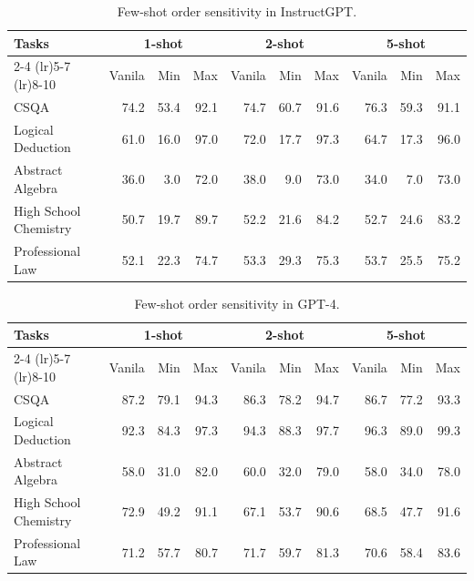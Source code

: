 \documentclass[11pt]{article}
\begin{document}
\begin{table}[t!]
\small
\centering
\begin{tabular}{lrrrrrrrrr}
\toprule 
\multirow{2}{*}{\bf Tasks} & \multicolumn{3}{c}{\bf 1-shot}&  \multicolumn{3}{c}{\bf 2-shot}&  \multicolumn{3}{c}{\bf 5-shot}\\
\cmidrule(lr){2-4}
\cmidrule(lr){5-7}
\cmidrule(lr){8-10}
&Vanila&Min&Max&Vanila&Min&Max&Vanila&Min&Max\\
\midrule
CSQA &74.2&53.4&92.1&74.7&60.7 & 91.6&76.3&59.3&91.1\\
Logical Deduction&61.0&16.0&97.0&72.0&17.7&97.3&64.7&17.3&96.0\\
Abstract Algebra &36.0&3.0&72.0&38.0&9.0&73.0&34.0&7.0&73.0\\
High School Chemistry &50.7&19.7&89.7&52.2&21.6&84.2&52.7&24.6&83.2\\
Professional Law &52.1&22.3&74.7&53.3&29.3&75.3&53.7&25.5&75.2\\
\bottomrule
\end{tabular}
\caption{Few-shot order sensitivity in InstructGPT.}
\label{tab:instruct-few}
\end{table}
\begin{table}[t!]
\small
\centering
\begin{tabular}{lrrrrrrrrr}
\toprule 
\multirow{2}{*}{\bf Tasks} & \multicolumn{3}{c}{\bf 1-shot}&  \multicolumn{3}{c}{\bf 2-shot}&  \multicolumn{3}{c}{\bf 5-shot}\\
\cmidrule(lr){2-4}
\cmidrule(lr){5-7}
\cmidrule(lr){8-10}
&Vanila&Min&Max&Vanila&Min&Max&Vanila&Min&Max\\
\midrule
CSQA &87.2&79.1&94.3&86.3&78.2&94.7&86.7&77.2&93.3\\
Logical Deduction&92.3&84.3&97.3&94.3&88.3&97.7&96.3&89.0&99.3\\
Abstract Algebra &58.0&31.0&82.0&60.0&32.0&79.0&58.0&34.0&78.0\\
High School Chemistry &72.9&49.2&91.1&67.1&53.7&90.6&68.5&47.7&91.6\\
Professional Law &71.2&57.7&80.7&71.7&59.7&81.3&70.6&58.4&83.6\\
\bottomrule
\end{tabular}
\caption{Few-shot order sensitivity in GPT-4.}
\label{tab:gpt4-few}
\end{table}
\end{document}
